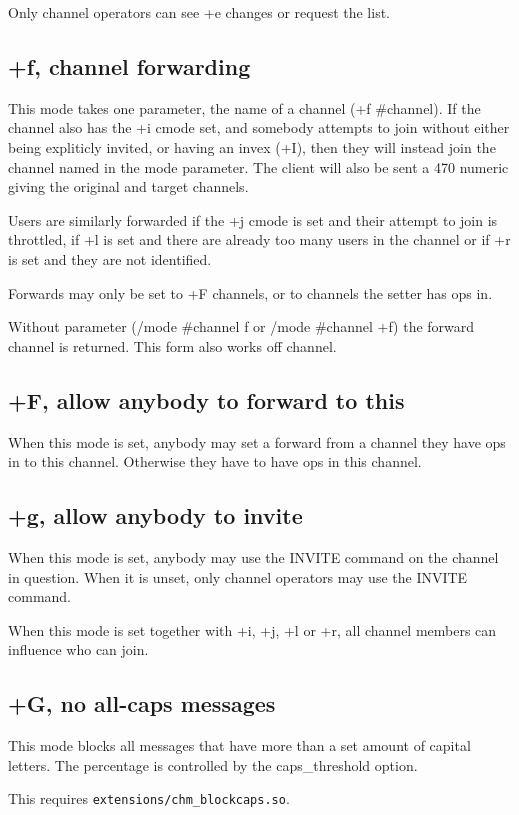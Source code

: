 	Only channel operators can see +e changes or request the list.

\subsection{+f, channel forwarding}
	This mode takes one parameter, the name of a channel (+f \#channel). If
	the channel also has the +i cmode set, and somebody attempts to join
	without either being expliticly invited, or having an invex (+I), then
	they will instead join the channel named in the mode parameter. The
	client will also be sent a 470 numeric giving the original and target
	channels.

	Users are similarly forwarded if the +j cmode is set and their attempt
	to join is throttled, if +l is set and there are already too many users
	in the channel or if +r is set and they are not identified.

	Forwards may only be set to +F channels, or to channels the setter has
	ops in.

	Without parameter (/mode \#channel f or /mode \#channel +f) the forward
	channel is returned. This form also works off channel.

\subsection{+F, allow anybody to forward to this}
	When this mode is set, anybody may set a forward from a channel they
	have ops in to this channel. Otherwise they have to have ops in this
	channel.

\subsection{+g, allow anybody to invite}
	When this mode is set, anybody may use the INVITE command on the
	channel in question. When it is unset, only channel operators may use
	the INVITE command.

	When this mode is set together with +i, +j, +l or +r, all channel
	members can influence who can join.

\subsection{+G, no all-{}caps messages}
	This mode blocks all messages that have more than a set amount of
	capital letters. The percentage is controlled by the caps\_threshold
	option.

	This requires \nolinkurl{extensions/chm\_blockcaps.so}.

